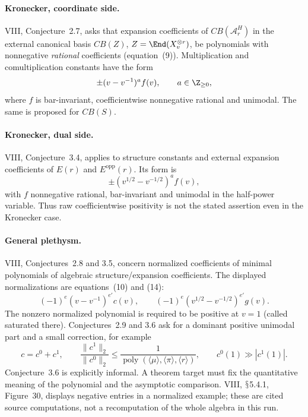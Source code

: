 \documentclass[11pt,a4paper]{article}
\renewcommand{\S}{\ensuremath{\mathsection}}
\theoremstyle{named}\newtheorem{finding}{Finding}[section]
\theoremstyle{definition}\newtheorem{definition}[finding]{Definition}
\theoremstyle{remark}\newtheorem{remark}[finding]{Remark}
\begin{document}
\paragraph{Kronecker, coordinate side.}
VIII, Conjecture~2.7, asks that expansion coefficients of $CB(\mathcal A_r^H)$ in the external canonical basis $CB(Z)$, $Z=\End(X_v^{\otimes r})$, be polynomials with nonnegative \emph{rational} coefficients (equation~(9)). Multiplication and comultiplication constants have the form
\begin{equation}\label{eq:kroneckerpositive}
 \pm(v-v^{-1})^a f(v),\qquad a\in\Z_{\ge0},
\end{equation}
where $f$ is bar-invariant, coefficientwise nonnegative rational and unimodal. The same is proposed for $CB(S)$.

\paragraph{Kronecker, dual side.}
VIII, Conjecture~3.4, applies to structure constants and external expansion coefficients of $E(r)$ and $E^{\mathrm{opp}}(r)$. Its form is
\begin{equation}\label{eq:dualpositive}
 \pm(v^{1/2}-v^{-1/2})^a f(v),
\end{equation}
with $f$ nonnegative rational, bar-invariant and unimodal in the half-power variable. Thus raw coefficientwise positivity is not the stated assertion even in the Kronecker case.

\paragraph{General plethysm.}
VIII, Conjectures~2.8 and 3.5, concern normalized coefficients of minimal polynomials of algebraic structure/expansion coefficients. The displayed normalizations are equations~(10) and (14):
\[
 (-1)^e(v-v^{-1})^{e'}c(v),\qquad
 (-1)^e(v^{1/2}-v^{-1/2})^{e'}g(v).
\]
The nonzero normalized polynomial is required to be positive at $v=1$ (called saturated there). Conjectures~2.9 and 3.6 ask for a dominant positive unimodal part and a small correction, for example
\[
 c=c^0+c^1,\qquad
 \frac{\|c^1\|_2}{\|c^0\|_2}
 \le\frac1{\operatorname{poly}(\langle\mu\rangle,\langle\pi\rangle,\langle r\rangle)},
 \qquad c^0(1)\gg |c^1(1)|.
\]
Conjecture~3.6 is explicitly informal. A theorem target must fix the quantitative meaning of the polynomial and the asymptotic comparison. VIII, \S5.4.1, Figure~30, displays negative entries in a normalized example; these are cited source computations, not a recomputation of the whole algebra in this run.
\end{document}
